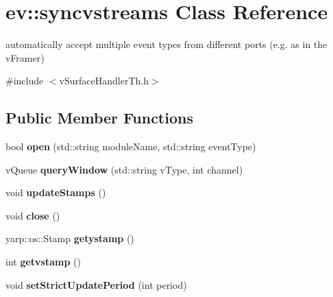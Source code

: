 \hypertarget{classev_1_1syncvstreams}{}\section{ev\+:\+:syncvstreams Class Reference}
\label{classev_1_1syncvstreams}


automatically accept multiple event types from different ports (e.\+g. as in the v\+Framer)  




{\ttfamily \#include $<$v\+Surface\+Handler\+Th.\+h$>$}

\subsection*{Public Member Functions}
\begin{DoxyCompactItemize}
\item 
bool {\bfseries open} (std\+::string module\+Name, std\+::string event\+Type)\hypertarget{classev_1_1syncvstreams_acc652540f64e92a0528e25932ff51d8f}{}\label{classev_1_1syncvstreams_acc652540f64e92a0528e25932ff51d8f}

\item 
v\+Queue {\bfseries query\+Window} (std\+::string v\+Type, int channel)\hypertarget{classev_1_1syncvstreams_a347bea90f23cf334667bb3e4b7bcf7a0}{}\label{classev_1_1syncvstreams_a347bea90f23cf334667bb3e4b7bcf7a0}

\item 
void {\bfseries update\+Stamps} ()\hypertarget{classev_1_1syncvstreams_a04f3e59f95d0749a6ceff9d7e426fb5d}{}\label{classev_1_1syncvstreams_a04f3e59f95d0749a6ceff9d7e426fb5d}

\item 
void {\bfseries close} ()\hypertarget{classev_1_1syncvstreams_ae4bdb73e97024c7399d8a105bdc8425a}{}\label{classev_1_1syncvstreams_ae4bdb73e97024c7399d8a105bdc8425a}

\item 
yarp\+::os\+::\+Stamp {\bfseries getystamp} ()\hypertarget{classev_1_1syncvstreams_a61e65f054ee803198d3e642df2bc1024}{}\label{classev_1_1syncvstreams_a61e65f054ee803198d3e642df2bc1024}

\item 
int {\bfseries getvstamp} ()\hypertarget{classev_1_1syncvstreams_a8846f86bb2794a7b6117c4f9d9c9fa65}{}\label{classev_1_1syncvstreams_a8846f86bb2794a7b6117c4f9d9c9fa65}

\item 
void {\bfseries set\+Strict\+Update\+Period} (int period)\hypertarget{classev_1_1syncvstreams_a83d0eb380a6a8eda16f35b45a7773da6}{}\label{classev_1_1syncvstreams_a83d0eb380a6a8eda16f35b45a7773da6}


\end{DoxyCompactItemize}
